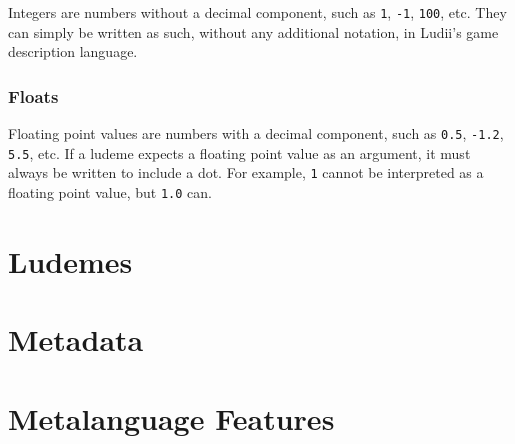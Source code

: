 \documentclass[10pt,twoside]{report}
\begin{document}
Integers are numbers without a decimal component, such as \texttt{1}, \texttt{-1}, \texttt{100}, etc. They can simply be written as such, without any additional notation, in Ludii's game description language.

\section{Floats} \label{Sec:Introduction.Floats}

Floating point values are numbers with a decimal component, such as \texttt{0.5}, \texttt{-1.2}, \texttt{5.5}, etc. If a ludeme expects a floating point value as an argument, it must always be written to include a dot. For example, \texttt{1} cannot be interpreted as a floating point value, but \texttt{1.0} can.


\part{Ludemes} \label{Part:GameDescriptions}


















\part{Metadata} \label{Part:Metadata}






\part{Metalanguage Features} \label{Part:MetalanguageFeatures}
\end{document}
